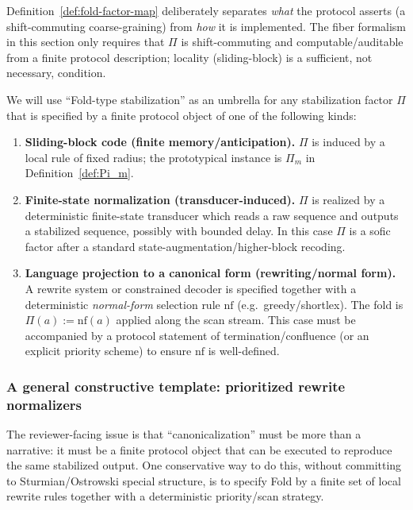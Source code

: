\begin{remark}
Definition~\ref{def:fold-factor-map} deliberately separates \emph{what} the protocol asserts (a shift-commuting coarse-graining) from \emph{how} it is implemented. The fiber formalism in this section only requires that $\Pi$ is shift-commuting and computable/auditable from a finite protocol description; locality (sliding-block) is a sufficient, not necessary, condition.
\end{remark}

\begin{definition}\label{def:fold-realizations}
We will use ``Fold-type stabilization'' as an umbrella for any stabilization factor $\Pi$ that is specified by a finite protocol object of one of the following kinds:
\begin{enumerate}[label=(\roman*),leftmargin=*,itemsep=2pt]
  \item \textbf{Sliding-block code (finite memory/anticipation).} $\Pi$ is induced by a local rule of fixed radius; the prototypical instance is $\Pi_m$ in Definition~\ref{def:Pi_m}.
  \item \textbf{Finite-state normalization (transducer-induced).} $\Pi$ is realized by a deterministic finite-state transducer which reads a raw sequence and outputs a stabilized sequence, possibly with bounded delay. In this case $\Pi$ is a sofic factor after a standard state-augmentation/higher-block recoding.\cite{AlloucheShallit2003AutomaticSequences}
  \item \textbf{Language projection to a canonical form (rewriting/normal form).} A rewrite system or constrained decoder is specified together with a deterministic \emph{normal-form} selection rule $\mathrm{nf}$ (e.g.\ greedy/shortlex). The fold is $\Pi(a):=\mathrm{nf}(a)$ applied along the scan stream. This case must be accompanied by a protocol statement of termination/confluence (or an explicit priority scheme) to ensure $\mathrm{nf}$ is well-defined.
\end{enumerate}
\end{definition}

\subsubsection{A general constructive template: prioritized rewrite normalizers}\label{sec:stabilization:fold-rewrite-template}

The reviewer-facing issue is that ``canonicalization'' must be more than a narrative: it must be a finite protocol object that can be executed to reproduce the same stabilized output.
One conservative way to do this, without committing to Sturmian/Ostrowski special structure, is to specify Fold by a finite set of local rewrite rules together with a deterministic priority/scan strategy.


